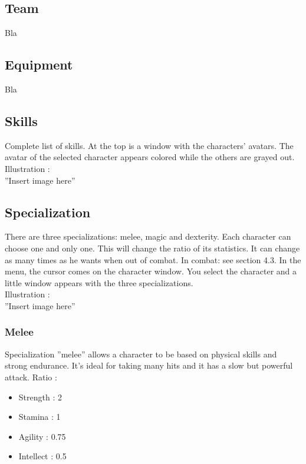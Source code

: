 \documentclass[a4paper,12pt]{book}
\begin{document}
\subsection{Team}
Bla
\subsection{Equipment}
Bla
\subsection{Skills}
Complete list of skills. At the top is a window with the characters' avatars. The avatar of the selected character appears colored while the others are grayed out. \\ Illustration : \\ ''Insert image here''
\subsection{Specialization}
There are three specializations: melee, magic and dexterity. Each character can choose one and only one. This will change the ratio of its statistics. It can change as many times as he wants when out of combat. In combat: see section 4.3.
In the menu, the cursor comes on the character window. You select the character and a little window appears with the three specializations. \\ Illustration : \\ ''Insert image here''
\subsubsection{Melee}
Specialization ''melee'' allows a character to be based on physical skills and strong endurance. It's ideal for taking many hits and it has a slow but powerful attack. \newpage
Ratio :
\begin{itemize}
	\item Strength : 2
	\item Stamina : 1
	\item Agility : 0.75
	\item Intellect : 0.5
\end{itemize}
\end{document}
